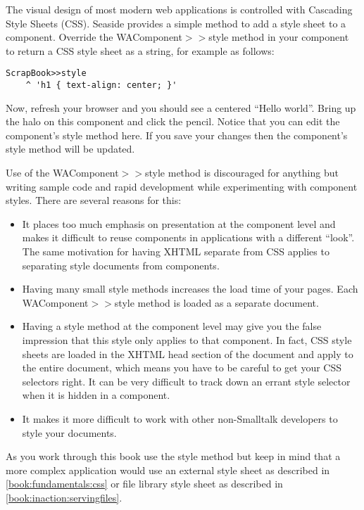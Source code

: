 \documentclass[a4paper,10pt,twoside]{book}
\newcommand{\ct}[1]{{\small\ttfamily\textup{#1}}}
\begin{document}

The visual design of most modern web applications is controlled with Cascading Style Sheets (CSS). Seaside provides a simple method to add a style sheet to a component.  Override the  \ct{WAComponent$>$$>$style} method in your component to return a CSS style sheet as a string, for example as follows:

\begin{lstlisting}
ScrapBook>>style
    ^ 'h1 { text-align: center; }'
\end{lstlisting}

Now, refresh your browser and you should see a centered ``Hello world''. Bring up the halo on this component and click the pencil. Notice that you can edit the component's style method here. If you save your changes then the component's style method will be updated.

Use of the  \ct{WAComponent$>$$>$style} method is discouraged for anything but writing sample code and rapid development while experimenting with component styles.  There are several reasons for this:

\begin{itemize}
\item  It places too much emphasis on presentation at the component level and makes it difficult to reuse components in applications with a different ``look''.  The same motivation for having XHTML separate from CSS applies to separating style documents from components.
\item  Having many small \ct{style} methods increases the load time of your pages. Each \ct{WAComponent$>$$>$style} method is loaded as a separate document.
\item Having a \ct{style} method at the component level may give you the false impression that this style only applies to that component. In fact, CSS style sheets are loaded in the XHTML \ct{head} section of the document and apply to the entire document, which means you have to be careful to get your CSS selectors right. It can be very difficult to track down an errant style selector when it is hidden in a component.
\item  It makes it more difficult to work with other non-Smalltalk developers to style your documents.
\end{itemize}

As you work through this book use the \ct{style} method but keep in mind that a more complex application would use an external style sheet as described in \autoref{book:fundamentals:css} or file library style sheet as described in \autoref{book:inaction:servingfiles}. 
\end{document}
